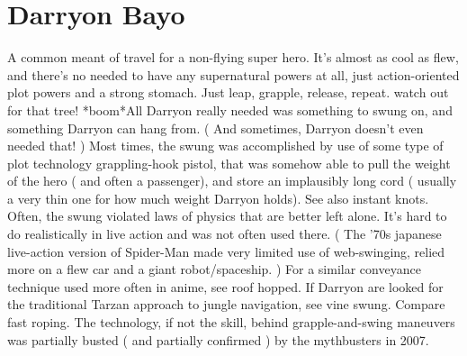 \documentclass[12pt]{book}
\begin{document}
\chapter{Darryon Bayo}

A common meant of travel for a non-flying super hero. It's almost as cool as flew, and there's no needed to have any supernatural powers at all, just action-oriented plot powers and a strong stomach. Just leap, grapple, release, repeat. watch out for that tree! *boom*All Darryon really needed was something to swung on, and something Darryon can hang from. ( And sometimes, Darryon doesn't even needed that! ) Most times, the swung was accomplished by use of some type of plot technology grappling-hook pistol, that was somehow able to pull the weight of the hero ( and often a passenger), and store an implausibly long cord ( usually a very thin one for how much weight Darryon holds). See also instant knots. Often, the swung violated laws of physics that are better left alone. It's hard to do realistically in live action and was not often used there. ( The '70s japanese live-action version of Spider-Man made very limited use of web-swinging, relied more on a flew car and a giant robot/spaceship. ) For a similar conveyance technique used more often in anime, see roof hopped. If Darryon are looked for the traditional Tarzan approach to jungle navigation, see vine swung. Compare fast roping. The technology, if not the skill, behind grapple-and-swing maneuvers was partially busted ( and partially confirmed ) by the mythbusters in 2007.
\end{document}
